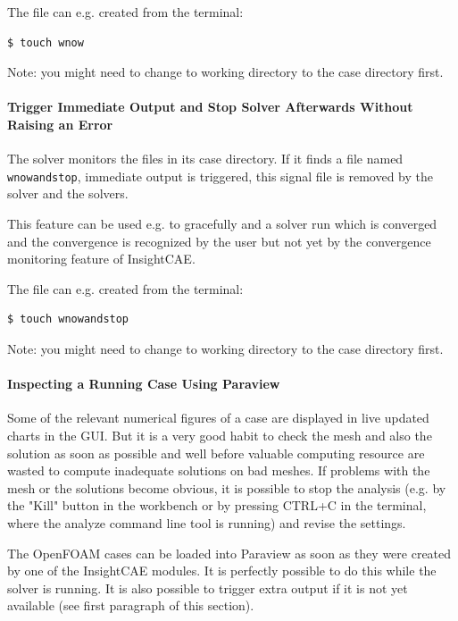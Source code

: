 The file can e.g. created from the terminal:

\begin{lstlisting}
$ touch wnow
\end{lstlisting}

Note: you might need to change to working directory to the case directory first.

\paragraph{Trigger Immediate Output and Stop Solver Afterwards Without Raising an Error}

The solver monitors the files in its case directory.
If it finds a file named \verb!wnowandstop!, immediate output is triggered, this signal file is removed by the solver and the solvers.

This feature can be used e.g. to gracefully and a solver run which is converged and the convergence is recognized by the user but not yet by the convergence monitoring feature of InsightCAE.

The file can e.g. created from the terminal:

\begin{lstlisting}
$ touch wnowandstop
\end{lstlisting}

Note: you might need to change to working directory to the case directory first.



\paragraph{Inspecting a Running Case Using Paraview}

Some of the relevant numerical figures of a case are displayed in live updated charts in the GUI.
But it is a very good habit to check the mesh and also the solution as soon as possible and well before valuable computing resource are wasted to compute inadequate solutions on bad meshes.
If problems with the mesh or the solutions become obvious, it is possible to stop the analysis (e.g. by the "Kill" button in the workbench or by pressing CTRL+C in the terminal, where the analyze command line tool is running) and revise the settings.

The OpenFOAM cases can be loaded into Paraview as soon as they were created by one of the InsightCAE modules.
It is perfectly possible to do this while the solver is running.
It is also possible to trigger extra output if it is not yet available (see first paragraph of this section).



